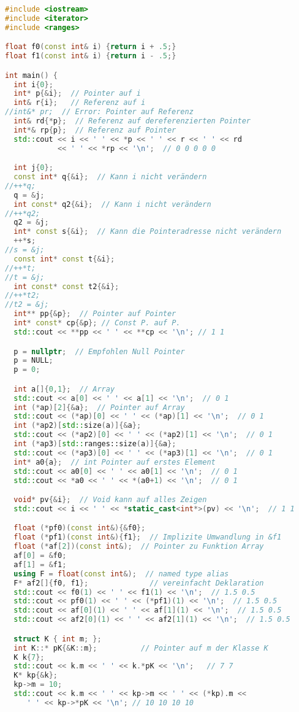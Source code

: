 \begin{lstlisting}[language=C++]
#include <iostream>
#include <iterator>
#include <ranges>

float f0(const int& i) {return i + .5;}
float f1(const int& i) {return i - .5;}

int main() {
  int i{0};
  int* p{&i};  // Pointer auf i
  int& r{i};   // Referenz auf i
//int&* pr;  // Error: Pointer auf Referenz
  int& rd{*p};  // Referenz auf dereferenzierten Pointer
  int*& rp{p};  // Referenz auf Pointer
  std::cout << i << ' ' << *p << ' ' << r << ' ' << rd
            << ' ' << *rp << '\n';  // 0 0 0 0 0

  int j{0};
  const int* q{&i};  // Kann i nicht verändern
//++*q;
  q = &j;
  int const* q2{&i};  // Kann i nicht verändern
//++*q2;
  q2 = &j;
  int* const s{&i};  // Kann die Pointeradresse nicht verändern
  ++*s;
//s = &j;
  const int* const t{&i};
//++*t;
//t = &j;
  int const* const t2{&i};
//++*t2;
//t2 = &j;
  int** pp{&p};  // Pointer auf Pointer
  int* const* cp{&p}; // Const P. auf P.
  std::cout << **pp << ' ' << **cp << '\n'; // 1 1

  p = nullptr;  // Empfohlen Null Pointer
  p = NULL;
  p = 0;

  int a[]{0,1};  // Array
  std::cout << a[0] << ' ' << a[1] << '\n';  // 0 1
  int (*ap)[2]{&a};  // Pointer auf Array
  std::cout << (*ap)[0] << ' ' << (*ap)[1] << '\n';  // 0 1
  int (*ap2)[std::size(a)]{&a};
  std::cout << (*ap2)[0] << ' ' << (*ap2)[1] << '\n';  // 0 1
  int (*ap3)[std::ranges::size(a)]{&a};
  std::cout << (*ap3)[0] << ' ' << (*ap3)[1] << '\n';  // 0 1
  int* a0{a};  // int Pointer auf erstes Element
  std::cout << a0[0] << ' ' << a0[1] << '\n';  // 0 1
  std::cout << *a0 << ' ' << *(a0+1) << '\n';  // 0 1

  void* pv{&i};  // Void kann auf alles Zeigen
  std::cout << i << ' ' << *static_cast<int*>(pv) << '\n';  // 1 1

  float (*pf0)(const int&){&f0};
  float (*pf1)(const int&){f1};  // Implizite Umwandlung in &f1
  float (*af[2])(const int&);  // Pointer zu Funktion Array
  af[0] = &f0;
  af[1] = &f1;
  using F = float(const int&);  // named type alias
  F* af2[]{f0, f1};              // vereinfacht Deklaration
  std::cout << f0(1) << ' ' << f1(1) << '\n';  // 1.5 0.5
  std::cout << pf0(1) << ' ' << (*pf1)(1) << '\n';  // 1.5 0.5
  std::cout << af[0](1) << ' ' << af[1](1) << '\n';  // 1.5 0.5
  std::cout << af2[0](1) << ' ' << af2[1](1) << '\n';  // 1.5 0.5

  struct K { int m; };
  int K::* pK{&K::m};          // Pointer auf m der Klasse K
  K k{7};
  std::cout << k.m << ' ' << k.*pK << '\n';   // 7 7
  K* kp{&k};
  kp->m = 10;
  std::cout << k.m << ' ' << kp->m << ' ' << (*kp).m <<
     ' ' << kp->*pK << '\n'; // 10 10 10 10


\end{lstlisting}
